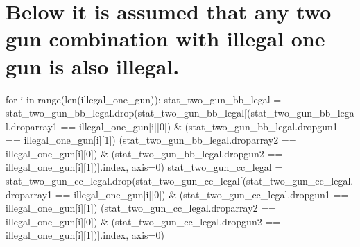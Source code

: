 \documentclass[11pt]{article}
\begin{document}
\section{Below it is assumed that any two gun combination with illegal
one gun is also
illegal.}\label{below-it-is-assumed-that-any-two-gun-combination-with-illegal-one-gun-is-also-illegal.}

for i in range(len(illegal\_one\_gun)): stat\_two\_gun\_bb\_legal =
stat\_two\_gun\_bb\_legal.drop(stat\_two\_gun\_bb\_legal{[}(stat\_two\_gun\_bb\_legal.droparray1
== illegal\_one\_gun{[}i{]}{[}0{]}) \&
(stat\_two\_gun\_bb\_legal.dropgun1 == illegal\_one\_gun{[}i{]}{[}1{]})
\textbar{} (stat\_two\_gun\_bb\_legal.droparray2 ==
illegal\_one\_gun{[}i{]}{[}0{]}) \& (stat\_two\_gun\_bb\_legal.dropgun2
== illegal\_one\_gun{[}i{]}{[}1{]}){]}.index, axis=0)
stat\_two\_gun\_cc\_legal =
stat\_two\_gun\_cc\_legal.drop(stat\_two\_gun\_cc\_legal{[}(stat\_two\_gun\_cc\_legal.droparray1
== illegal\_one\_gun{[}i{]}{[}0{]}) \&
(stat\_two\_gun\_cc\_legal.dropgun1 == illegal\_one\_gun{[}i{]}{[}1{]})
\textbar{} (stat\_two\_gun\_cc\_legal.droparray2 ==
illegal\_one\_gun{[}i{]}{[}0{]}) \& (stat\_two\_gun\_cc\_legal.dropgun2
== illegal\_one\_gun{[}i{]}{[}1{]}){]}.index, axis=0)
\end{document}
